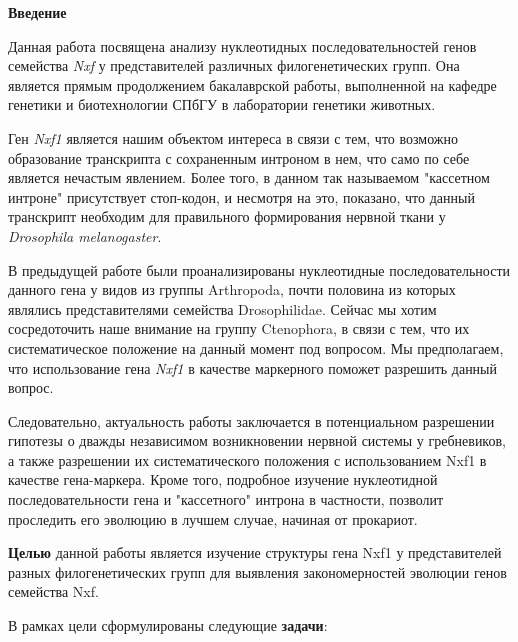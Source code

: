 \newpage
\begin{center}
  \textbf{\large Введение}
\end{center}


Данная работа посвящена анализу нуклеотидных последовательностей генов семейства \textit{Nxf} у представителей различных филогенетических групп.
Она является прямым продолжением бакалаврской работы, выполненной на кафедре генетики и биотехнологии СПбГУ в лаборатории генетики животных.

Ген \textit{Nxf1} является нашим объектом интереса в связи с тем, что возможно образование транскрипта с сохраненным интроном в нем, что само по себе является нечастым явлением.
Более того, в данном так называемом "кассетном интроне" присутствует стоп-кодон, и несмотря на это, показано, что данный транскрипт необходим для правильного формирования нервной ткани у \textit{Drosophila melanogaster}.

В предыдущей работе были проанализированы нуклеотидные последовательности данного гена у видов из группы Arthropoda, почти половина из которых являлись представителями семейства Drosophilidae.
Сейчас мы хотим сосредоточить наше внимание на группу Ctenophora, в связи с тем, что их систематическое положение на данный момент под вопросом.
Мы предполагаем, что использование гена \textit{Nxf1} в качестве маркерного поможет разрешить данный вопрос.

Следовательно, актуальность работы заключается в потенциальном разрешении гипотезы о дважды независимом возникновении нервной системы у гребневиков, а также разрешении их систематического положения с использованием Nxf1 в качестве гена-маркера.
Кроме того, подробное изучение нуклеотидной последовательности гена и "кассетного" интрона в частности, позволит проследить его эволюцию в лучшем случае, начиная от прокариот.

\textbf{Целью} данной работы является изучение структуры гена Nxf1 у представителей разных филогенетических групп для выявления закономерностей эволюции генов семейства Nxf.

В рамках цели сформулированы следующие \textbf{задачи}:

